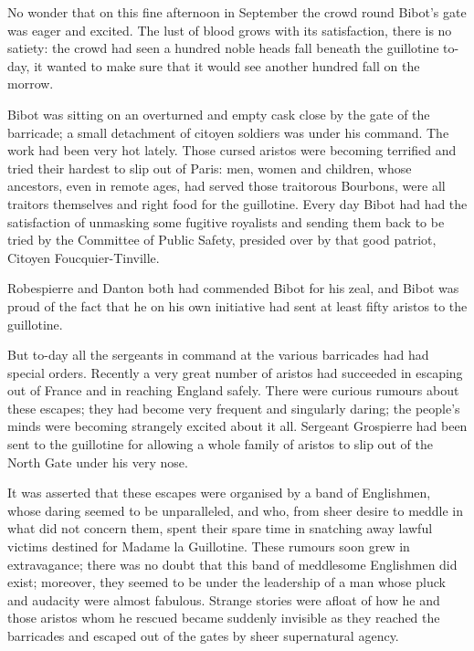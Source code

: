 No wonder that on this fine afternoon in September the crowd round Bibot's gate was eager and excited. The lust of blood grows with its satisfaction, there is no satiety: the crowd had seen a hundred noble heads fall beneath the guillotine to-day, it wanted to make sure that it would see another hundred fall on the morrow.

Bibot was sitting on an overturned and empty cask close by the gate of the barricade; a small detachment of citoyen soldiers was under his command. The work had been very hot lately. Those cursed aristos were becoming terrified and tried their hardest to slip out of Paris: men, women and children, whose ancestors, even in remote ages, had served those traitorous Bourbons, were all traitors themselves and right food for the guillotine. Every day Bibot had had the satisfaction of unmasking some fugitive royalists and sending them back to be tried by the Committee of Public Safety, presided over by that good patriot, Citoyen Foucquier-Tinville.

Robespierre and Danton both had commended Bibot for his zeal, and Bibot was proud of the fact that he on his own initiative had sent at least fifty aristos to the guillotine.

But to-day all the sergeants in command at the various barricades had had special orders. Recently a very great number of aristos had succeeded in escaping out of France and in reaching England safely. There were curious rumours about these escapes; they had become very frequent and singularly daring; the people's minds were becoming strangely excited about it all. Sergeant Grospierre had been sent to the guillotine for allowing a whole family of aristos to slip out of the North Gate under his very nose.

It was asserted that these escapes were organised by a band of Englishmen, whose daring seemed to be unparalleled, and who, from sheer desire to meddle in what did not concern them, spent their spare time in snatching away lawful victims destined for Madame la Guillotine. These rumours soon grew in extravagance; there was no doubt that this band of meddlesome Englishmen did exist; moreover, they seemed to be under the leadership of a man whose pluck and audacity were almost fabulous. Strange stories were afloat of how he and those aristos whom he rescued became suddenly invisible as they reached the barricades and escaped out of the gates by sheer supernatural agency.

